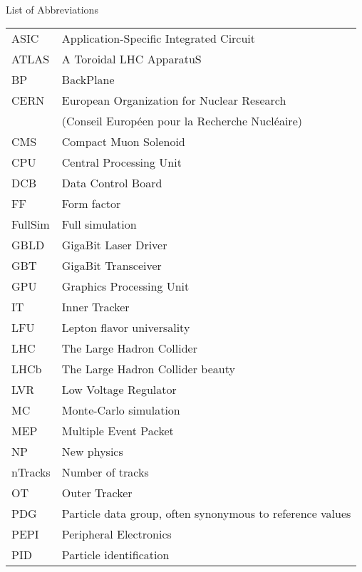 \singlespacing \normalsize
\hbox{\ }

\vspace{.5in}

\begin{center}
\large{List of Abbreviations}
\end{center}

\vspace{3pt}

\begin{supertabular}{ll}
    ASIC    & Application-Specific Integrated Circuit \\
    ATLAS   & A Toroidal LHC ApparatuS \\
    BP      & BackPlane \\
    CERN    & European Organization for Nuclear Research \\
            & (Conseil Européen pour la Recherche Nucléaire) \\
    CMS     & Compact Muon Solenoid \\
    CPU     & Central Processing Unit \\
    DCB     & Data Control Board \\
    FF      & Form factor \\
    FullSim & Full simulation \\
    GBLD    & GigaBit Laser Driver \\
    GBT     & GigaBit Transceiver \\
    GPU     & Graphics Processing Unit \\
    IT      & Inner Tracker \\
    LFU     & Lepton flavor universality \\
    LHC     & The Large Hadron Collider \\
    LHCb    & The Large Hadron Collider beauty \\
    LVR     & Low Voltage Regulator \\
    MC      & Monte-Carlo simulation \\
    MEP     & Multiple Event Packet \\
    NP      & New physics \\
    nTracks & Number of tracks \\
    OT      & Outer Tracker \\
    PDG     & Particle data group, often synonymous to reference values \\
    PEPI    & Peripheral Electronics \\
    PID     & Particle identification \\

\end{supertabular}
